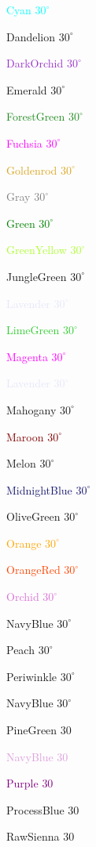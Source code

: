 \documentclass[12pt,a4paper]{article}
\begin{document}
\textcolor{Cyan}{Cyan $30^\circ$}

\textcolor{Dandelion}{Dandelion $30^\circ$}

\textcolor{DarkOrchid}{DarkOrchid $30^\circ$}

\textcolor{Emerald}{Emerald $30^\circ$}

\textcolor{ForestGreen}{ForestGreen $30^\circ$}

\textcolor{Fuchsia}{Fuchsia $30^\circ$}

\textcolor{Goldenrod}{Goldenrod $30^\circ$}

\textcolor{Gray}{Gray $30^\circ$}

\textcolor{Green}{Green $30^\circ$}

\textcolor{GreenYellow}{GreenYellow $30^\circ$}

\textcolor{JungleGreen}{JungleGreen $30^\circ$}

\textcolor{Lavender}{Lavender $30^\circ$}	
 	 	 	
\textcolor{LimeGreen}{LimeGreen $30^\circ$}	

\textcolor{Magenta}{Magenta $30^\circ$}	

\textcolor{Lavender}{Lavender $30^\circ$}	

\textcolor{Mahogany}{Mahogany $30^\circ$}	
 	 	 	
\textcolor{Maroon}{Maroon $30^\circ$}	

\textcolor{Melon}{Melon $30^\circ$}	

\textcolor{MidnightBlue}{MidnightBlue $30^\circ$}	

\textcolor{OliveGreen}{OliveGreen $30^\circ$}	 
 	 	 	
\textcolor{Orange}{Orange $30^\circ$}	  	 	 	

\textcolor{OrangeRed}{OrangeRed $30^\circ$}

\textcolor{Orchid}{Orchid $30^\circ$}

\textcolor{NavyBlue}{NavyBlue $30^\circ$}

\textcolor{Peach}{Peach $30^\circ$}

\textcolor{Periwinkle}{Periwinkle $30^\circ$}

\textcolor{NavyBlue}{NavyBlue $30^\circ$}

\textcolor{PineGreen}{PineGreen $30$}

\textcolor{Plum}{NavyBlue $30$}

\textcolor{Purple}{Purple $30$}

\textcolor{ProcessBlue}{ProcessBlue $30$}

\textcolor{RawSienna}{RawSienna $30$}
\end{document}
